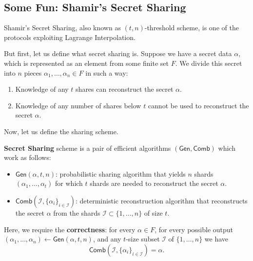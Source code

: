 \documentclass[../lecture-notes.tex]{subfiles}
\begin{document}
\subsection{Some Fun: Shamir's Secret Sharing}

Shamir's Secret Sharing, also known as $(t,n)$-threshold scheme, is one of the protocols exploiting Lagrange Interpolation. 

But first, let us define what secret sharing is. Suppose we have a secret data $\alpha$, which is represented as an element from some finite set $F$. We divide this secret into $n$ pieces $\alpha_1,\dots,\alpha_n \in F$ in such a way:
\begin{enumerate}
    \item Knowledge of any $t$ shares can reconstruct the secret $\alpha$.
    \item Knowledge of any number of shares below $t$ cannot be used to reconstruct the secret $\alpha$.
\end{enumerate}

Now, let us define the sharing scheme.

\begin{definition}
    \textbf{Secret Sharing} scheme is a pair of efficient algorithms $(\mathsf{Gen}, \mathsf{Comb})$ which work as follows:
    \begin{itemize}
        \item $\mathsf{Gen}(\alpha, t, n)$: probabilistic sharing algorithm that yields $n$ shards $(\alpha_1,\dots,\alpha_t)$ for which $t$ shards are needed to reconstruct the secret $\alpha$.
        \item $\mathsf{Comb}(\mathcal{I}, \{\alpha_i\}_{i \in \mathcal{I}})$: deterministic reconstruction algorithm that reconstructs the secret $\alpha$ from the shards $\mathcal{I} \subset \{1,\dots,n\}$ of size $t$.
    \end{itemize}

    Here, we require the \textbf{correctness}: for every $\alpha \in F$, for every possible output $(\alpha_1,\dots,\alpha_n) \gets \mathsf{Gen}(\alpha, t, n)$, and any $t$-size subset $\mathcal{I}$ of $\{1,\dots,n\}$ we have
    \begin{equation}
        \mathsf{Comb}(\mathcal{I}, \{\alpha_i\}_{i \in \mathcal{I}}) = \alpha.
    \end{equation}
\end{definition}
\end{document}
